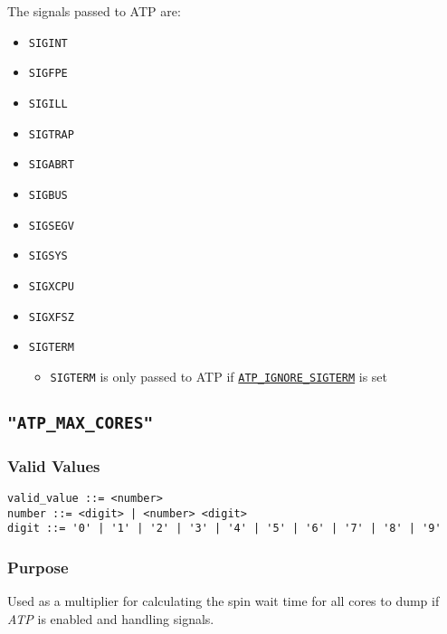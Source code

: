 The signals passed to ATP are:
\begin{itemize}
    \item \texttt{SIGINT}
    \item \texttt{SIGFPE}
    \item \texttt{SIGILL}
    \item \texttt{SIGTRAP}
    \item \texttt{SIGABRT}
    \item \texttt{SIGBUS}
    \item \texttt{SIGSEGV}
    \item \texttt{SIGSYS}
    \item \texttt{SIGXCPU}
    \item \texttt{SIGXFSZ}
    \item \texttt{SIGTERM}
    \begin{itemize}
        \item \texttt{SIGTERM} is only passed to ATP if \hyperref[section:flags:ATP_IGNORE_SIGTERM]{\texttt{ATP\_IGNORE\_SIGTERM}} is set
    \end{itemize}
\end{itemize}



\subsection{\texttt{"ATP\_MAX\_CORES"}}
\label{section:flags:ATP_MAX_CORES}
\vspace{-2ex}
\subsubsection{Valid Values}
\vspace{-2ex}
\verb+valid_value ::= <number>+ \\
\verb+number ::= <digit> | <number> <digit>+ \\
\verb+digit ::= '0' | '1' | '2' | '3' | '4' | '5' | '6' | '7' | '8' | '9'+

\vspace{-2ex}
\subsubsection{Purpose}
\vspace{-2ex}
Used as a multiplier for calculating the spin wait time for all cores to dump if \textit{ATP} is enabled and handling signals.

